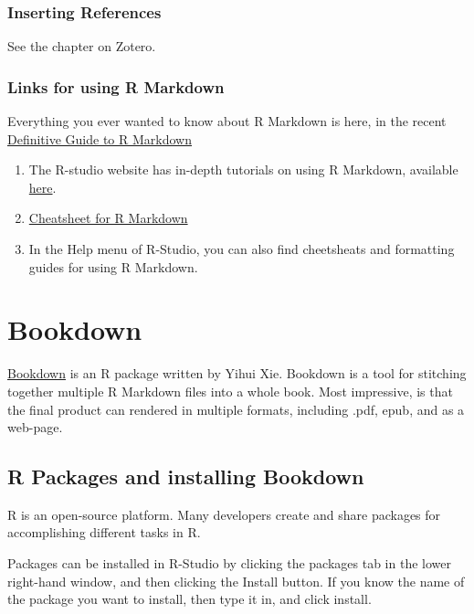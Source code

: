 \documentclass[]{book}
\providecommand{\tightlist}{%
  \setlength{\itemsep}{0pt}\setlength{\parskip}{0pt}}
\begin{document}
\subsection{Inserting References}\label{inserting-references}

See the chapter on Zotero.

\subsection{Links for using R
Markdown}\label{links-for-using-r-markdown}

Everything you ever wanted to know about R Markdown is here, in the
recent \href{https://bookdown.org/yihui/rmarkdown/}{Definitive Guide to
R Markdown}

\begin{enumerate}
\def\labelenumi{\arabic{enumi}.}
\tightlist
\item
  The R-studio website has in-depth tutorials on using R Markdown,
  available \href{http://rmarkdown.rstudio.com/lesson-1.html}{here}.
\item
  \href{http://rmarkdown.rstudio.com/lesson-15.html}{Cheatsheet for R
  Markdown}
\item
  In the Help menu of R-Studio, you can also find cheetsheats and
  formatting guides for using R Markdown.
\end{enumerate}

\chapter{Bookdown}\label{bookdown}

\href{https://bookdown.org/yihui/bookdown/}{Bookdown} is an R package
written by Yihui Xie. Bookdown is a tool for stitching together multiple
R Markdown files into a whole book. Most impressive, is that the final
product can rendered in multiple formats, including .pdf, epub, and as a
web-page.

\section{R Packages and installing
Bookdown}\label{r-packages-and-installing-bookdown}

R is an open-source platform. Many developers create and share packages
for accomplishing different tasks in R.

Packages can be installed in R-Studio by clicking the packages tab in
the lower right-hand window, and then clicking the Install button. If
you know the name of the package you want to install, then type it in,
and click install.
\end{document}
